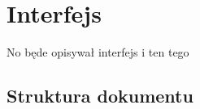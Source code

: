 \chapter{Interfejs}
\label{cha:interfejs}

No będe opisywał interfejs i ten tego

\section{Struktura dokumentu}



